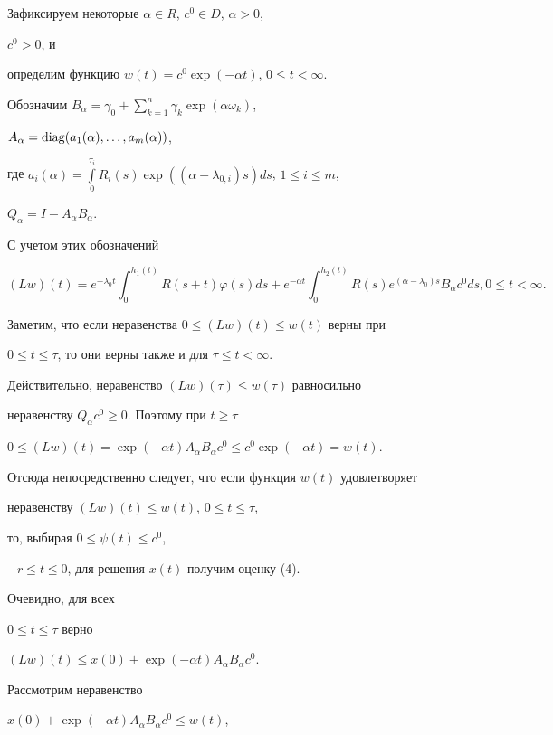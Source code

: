 \begin{pf}


Зафиксируем некоторые $\alpha \in R$, $c^0\in D$, $\alpha > 0$,


$c^0>0$, и


определим функцию $w(t)=c^0\exp(-\alpha t)$, $0 \le t < \infty$.


Обозначим $B_\alpha = \gamma_0+\sum\limits_{k=1}^n \gamma_k


\exp(\alpha \omega_k)$,


$A_\alpha=\operatorname{diag}(a_1(\alpha),\dotsc,a_m(\alpha))$,


где $a_i(\alpha)=\int\limits_0^{\tau_i}R_i(s)


\exp((\alpha-\lambda_{0,i})s)ds$, $1 \le i \le m $,


$Q_\alpha = I-A_\alpha B_\alpha$.


С учетом этих обозначений


$$


(Lw)(t) = e^{-\lambda_0 t}\int_0^{h_1(t)}R(s+t)


\varphi (s)ds + e^{-\alpha t}\int_0^{h_2(t)}R(s)


e^{(\alpha-\lambda_0)s}B_\alpha c^0 ds, 0 \le t < \infty.


$$


Заметим, что если неравенства $0 \le (Lw)(t) \le w(t)$ верны при


$0 \le t \le \tau$, то они верны также и для $\tau \le t < \infty$.


Действительно, неравенство $(Lw)(\tau) \le w(\tau)$ равносильно


неравенству $Q_\alpha c^0 \ge 0$. Поэтому при $t \ge \tau\;$


$0 \le (Lw)(t)=\exp(-\alpha t)A_\alpha B_\alpha c^0


\le c^0 \exp(-\alpha t)=w(t)$.


Отсюда непосредственно следует, что если функция $w(t)$ удовлетворяет


неравенству $(Lw)(t) \le w(t)$, $0 \le t \le \tau$,


то, выбирая $0 \le \psi(t) \le c^0$,


$-r\le t \le 0$, для решения $x(t)$ получим оценку (4).


Очевидно, для всех


$0\le t\le\tau$ верно


$(Lw)(t)\le x(0)+\exp(-\alpha t)A_\alpha B_\alpha c^0$.


Рассмотрим неравенство


$x(0)+\exp(-\alpha t)A_\alpha B_\alpha c^0 \le w(t)$,



\end{pf}

